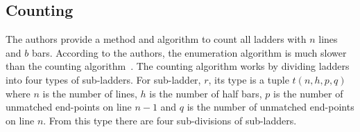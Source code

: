 

\subsection{Counting}
The authors provide a method and algorithm to count all ladders 
with $n$ lines and $b$ bars. According to the authors, the enumeration algorithm is 
much slower than the counting algorithm~\cite{A6}. The counting algorithm 
works by dividing ladders into four types of sub-ladders.
For sub-ladder, $r$, its type is a tuple $t(n,h,p,q)$ where 
$n$ is the number of lines, $h$ is the number of half bars, 
$p$ is the number of unmatched end-points on line $n-1$ and 
$q$ is the number of unmatched end-points on line $n$. From this 
type there are four sub-divisions of sub-ladders.\cite{A6}


